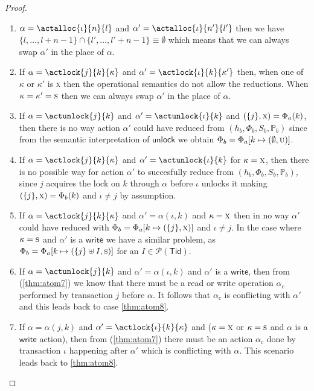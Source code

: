 \begin{thm}
{\begin{proof}
\begin{enumerate}[label=({\roman*})]
	\item $\alpha = \actalloc{\iota}{n}{l}$ and $\alpha' = \actalloc{\iota}{n'}{l'}$ then we have $\{l, \ldots, l + n - 1\} \cap \{l', \ldots, l' + n - 1\} \equiv \emptyset$  which means that we can always swap $\alpha'$ in the place of $\alpha$.
	
	\item If $\alpha = \actlock{j}{k}{\kappa}$ and $\alpha' = \actlock{\iota}{k}{\kappa'}$ then, when one of $\kappa$ or $\kappa'$ is \textsc{x} then the operational semantics do not allow the reductions. When $\kappa = \kappa' = \textsc{s}$ then we can always swap $\alpha'$ in the place of $\alpha$.
	
	\item If $\alpha = \actunlock{j}{k}$ and $\alpha' = \actunlock{\iota}{k}$ and $(\{j\}, \textsc{x}) = \Phi_a(k)$, then there is no way action $\alpha'$ could have reduced from $(h_b, \Phi_b, S_b, \mathds{P}_b)$ since from the semantic interpretation of $\mathsf{unlock}$ we obtain $\Phi_b = \Phi_a[k \mapsto (\emptyset, \textsc{u})]$.
	
	\item If $\alpha = \actlock{j}{k}{\kappa}$ and $\alpha' = \actunlock{\iota}{k}$ for $\kappa = \textsc{x}$, then there is no possible way for action $\alpha'$ to succesfully reduce from $(h_b, \Phi_b, S_b, \mathds{P}_b)$, since $j$ acquires the lock on $k$ through $\alpha$ before $\iota$ unlocks it making $(\{j\}, \textsc{x}) = \Phi_b(k)$ and $\iota \neq j$ by assumption.
	
	\item If $\alpha = \actlock{j}{k}{\kappa}$ and $\alpha' = \alpha(\iota, k)$ and $\kappa = \textsc{x}$ then in no way $\alpha'$ could have reduced with $\Phi_b = \Phi_a[k \mapsto (\{j\}, \textsc{x})]$ and $\iota \neq j$. In the case where $\kappa = \textsc{s}$ and $\alpha'$ is a $\mathsf{write}$ we have a similar problem, as $\Phi_b = \Phi_a[k \mapsto (\{j\} \uplus I, \textsc{s})]$ for an $I \in \mathcal{P}(\mathsf{Tid})$.
	
	\item If $\alpha = \actunlock{j}{k}$ and $\alpha' = \alpha(\iota, k)$ and $\alpha'$ is a $\mathsf{write}$, then from (\ref{thm:atom7}) we know that there must be a read or write operation $\alpha_c$ performed by transaction $j$ before $\alpha$. It follows that $\alpha_c$ is conflicting with $\alpha'$ and this leads back to case \ref{thm:atom8}.
	
	\item If $\alpha = \alpha(j, k)$ and $\alpha' = \actlock{\iota}{k}{\kappa}$ and ($\kappa = \textsc{x}$ or $\kappa = \textsc{s}$ and $\alpha$ is a $\mathsf{write}$ action), then from (\ref{thm:atom7}) there must be an action $\alpha_c$ done by transaction $\iota$ happening after $\alpha'$ which is conflicting with $\alpha$. This scenario leads back to \ref{thm:atom8}.
	

\end{enumerate}
\end{proof}}
\end{thm}
